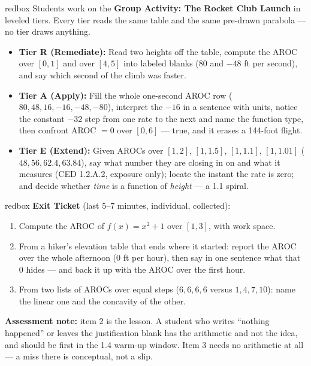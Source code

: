 \documentclass[10pt]{article}
\begin{document}
\begin{skillbox}{redbox}
Students work on the \textbf{Group Activity: The Rocket Club Launch} in
leveled tiers. Every tier reads the same table and the same pre-drawn
parabola --- no tier draws anything.

\begin{itemize}
  \item \textbf{Tier R (Remediate):} Read two heights off the table, compute
        the AROC over $[0,1]$ and over $[4,5]$ into labeled blanks
        ($80$ and $-48$ ft per second), and say which second of the climb was
        faster.
  \item \textbf{Tier A (Apply):} Fill the whole one-second AROC row
        ($80, 48, 16, -16, -48, -80$), interpret the $-16$ in a sentence with
        units, notice the constant $-32$ step from one rate to the next and
        name the function type, then confront AROC $=0$ over $[0,6]$ --- true,
        and it erases a 144-foot flight.
  \item \textbf{Tier E (Extend):} Given AROCs over $[1,2]$, $[1,1.5]$,
        $[1,1.1]$, $[1,1.01]$ ($48, 56, 62.4, 63.84$), say what number they
        are closing in on and what it measures (CED 1.2.A.2, exposure only);
        locate the instant the rate is zero; and decide whether \textit{time}
        is a function of \textit{height} --- a 1.1 spiral.
\end{itemize}
\end{skillbox}

\begin{skillbox}{redbox}
\textbf{Exit Ticket} (last 5--7 minutes, individual, collected):
\begin{enumerate}
  \item Compute the AROC of $f(x) = x^2 + 1$ over $[1,3]$, with work space.
  \item From a hiker's elevation table that ends where it started: report the
        AROC over the whole afternoon ($0$ ft per hour), then say in one
        sentence what that $0$ hides --- and back it up with the AROC over the
        first hour.
  \item From two lists of AROCs over equal steps ($6,6,6,6$ versus
        $1,4,7,10$): name the linear one and the concavity of the other.
\end{enumerate}
\textbf{Assessment note:} item 2 is the lesson. A student who writes
``nothing happened'' or leaves the justification blank has the arithmetic and
not the idea, and should be first in the 1.4 warm-up window. Item 3 needs no
arithmetic at all --- a miss there is conceptual, not a slip.
\end{skillbox}
\end{document}
